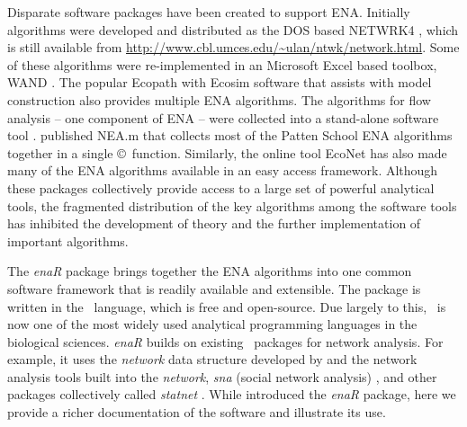 \documentclass[article]{jss}
\newcommand{\R}{\proglang{R}}
\begin{document}

Disparate software packages have been created to support
ENA. Initially algorithms were developed and distributed as the DOS
based NETWRK4 \cite{ulanowicz91}, which is still available from
\url{http://www.cbl.umces.edu/~ulan/ntwk/network.html}.  Some of these
algorithms were re-implemented in an Microsoft Excel based toolbox,
WAND \cite{allesina04_wand}. The popular Ecopath with Ecosim software
that assists with model construction \citep{christensen04} also
provides multiple ENA algorithms.  The algorithms for flow analysis --
one component of ENA -- were collected into a stand-alone software
tool \citep{latham2006}.  \citet{fath06} published NEA.m that collects
most of the Patten School ENA algorithms together in a single
\copyright\ function. Similarly, the online tool EcoNet
\citep{kazanci07} has also made many of the ENA algorithms available
in an easy access framework.  Although these packages collectively
provide access to a large set of powerful analytical tools, the
fragmented distribution of the key algorithms among the software tools
has inhibited the development of theory and the further implementation
of important algorithms.


The \textit{enaR} package brings together the ENA algorithms into one
common software framework that is readily available and extensible.
The package is written in the \R\ language, which is free and
open-source.  Due largely to this, \R\ is now one of the most widely
used analytical programming languages in the biological
sciences. \textit{enaR} builds on existing \R\ packages for network
analysis. For example, it uses the \textit{network} data structure
developed by \citet{butts08_network} and the network analysis tools
built into the \textit{network}, \textit{sna} (social network
analysis) \citep{butts08_social}, and other packages collectively
called \textit{statnet} \citep{handcock2008statnet}. While
\citet{borrett14_enar} introduced the \textit{enaR} package, here we
provide a richer documentation of the software and illustrate its use.






\end{document}
